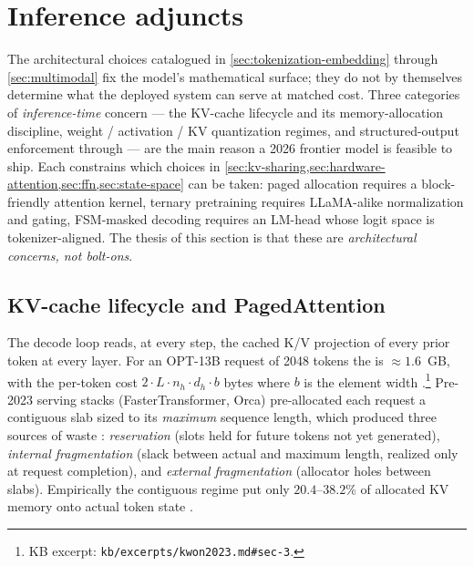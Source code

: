 
\section{Inference adjuncts}
\label{sec:inference-adjuncts}

The architectural choices catalogued in \cref{sec:tokenization-embedding}
through \cref{sec:multimodal} fix the model's mathematical surface; they
do not by themselves determine what the deployed system can serve at
matched cost. Three categories of \emph{inference-time} concern --- the
KV-cache lifecycle and its memory-allocation discipline, weight /
activation / KV quantization regimes, and structured-output enforcement
through  --- are the main reason a 2026
frontier model is feasible to ship. Each constrains which choices in
\cref{sec:kv-sharing,sec:hardware-attention,sec:ffn,sec:state-space}
can be taken: paged allocation requires a block-friendly attention
kernel, ternary pretraining requires LLaMA-alike normalization and
gating, FSM-masked decoding requires an LM-head whose logit space is
tokenizer-aligned. The thesis of this section is that these are
\emph{architectural concerns, not bolt-ons}.

\subsection{KV-cache lifecycle and PagedAttention}
\label{sec:kv-paged}

The  decode loop reads, at every step, the cached K/V
projection of every prior token at every layer. For an OPT-13B request
of 2048 tokens the  is $\approx 1.6$~GB, with the per-token
cost $2 \cdot L \cdot n_h \cdot d_h \cdot b$ bytes where $b$ is the
element width \citep[\S 3]{kwon2023}.\footnote{KB excerpt:
\nolinkurl{kb/excerpts/kwon2023.md#sec-3}.} Pre-2023 serving stacks
(FasterTransformer, Orca) pre-allocated each request a contiguous slab
sized to its \emph{maximum} sequence length, which produced three
sources of waste \citep[\S 3]{kwon2023}: \emph{reservation} (slots
held for future tokens not yet generated), \emph{internal
fragmentation} (slack between actual and maximum length, realized only
at request completion), and \emph{external fragmentation} (allocator
holes between slabs). Empirically the contiguous regime put only
$20.4$--$38.2$\% of allocated KV memory onto actual token state
\citep[\S 3, Fig.~2]{kwon2023}.

